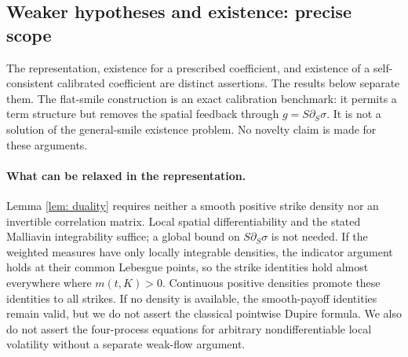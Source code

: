 \subsection{Weaker hypotheses and existence: precise scope}\label{subsec: existence}
The representation, existence for a prescribed coefficient, and existence of a
self-consistent calibrated coefficient are distinct assertions. The results below
separate them. The flat-smile construction is an exact calibration benchmark:
it permits a term structure but removes the spatial feedback through
$g=S\partial_S\sigma$. It is not a solution of the general-smile existence
problem. No novelty claim is made for these arguments.

\paragraph{What can be relaxed in the representation.}
Lemma \ref{lem: duality} requires neither a smooth positive strike density nor an
invertible correlation matrix. Local spatial differentiability and the stated
Malliavin integrability suffice; a global bound on $S\partial_S\sigma$ is not
needed. If the weighted measures have only locally integrable densities, the
indicator argument holds at their common Lebesgue points, so the strike identities
hold almost everywhere where $m(t,K)>0$. Continuous positive densities promote
these identities to all strikes. If no density is available, the smooth-payoff
identities remain valid, but we do not assert the classical pointwise Dupire
formula. We also do not assert the four-process equations for arbitrary
nondifferentiable local volatility without a separate weak-flow argument.

